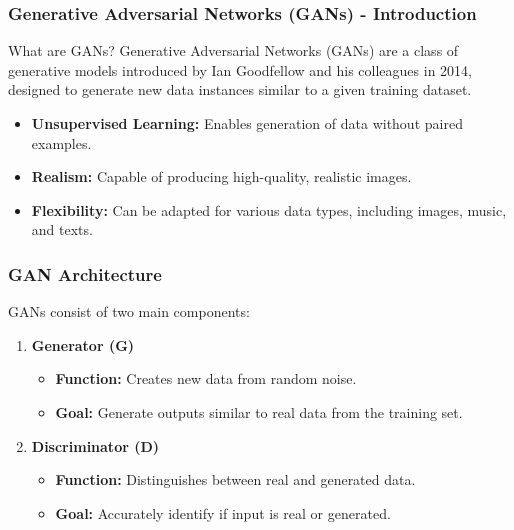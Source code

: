\documentclass[aspectratio=169]{beamer}
\begin{document}
\begin{frame}[fragile]
    \frametitle{Generative Adversarial Networks (GANs) - Introduction}
    \begin{block}{What are GANs?}
        Generative Adversarial Networks (GANs) are a class of generative models introduced by Ian Goodfellow and his colleagues in 2014, designed to generate new data instances similar to a given training dataset.
    \end{block}
    
    \begin{itemize}
        \item \textbf{Unsupervised Learning:} Enables generation of data without paired examples.
        \item \textbf{Realism:} Capable of producing high-quality, realistic images.
        \item \textbf{Flexibility:} Can be adapted for various data types, including images, music, and texts.
    \end{itemize}
\end{frame}

\begin{frame}[fragile]
    \frametitle{GAN Architecture}
    GANs consist of two main components:
    
    \begin{enumerate}
        \item \textbf{Generator (G)}
            \begin{itemize}
                \item \textbf{Function:} Creates new data from random noise.
                \item \textbf{Goal:} Generate outputs similar to real data from the training set.
            \end{itemize}
        \item \textbf{Discriminator (D)}
            \begin{itemize}
                \item \textbf{Function:} Distinguishes between real and generated data.
                \item \textbf{Goal:} Accurately identify if input is real or generated.
            \end{itemize}
    \end{enumerate}
\end{frame}
\end{document}
